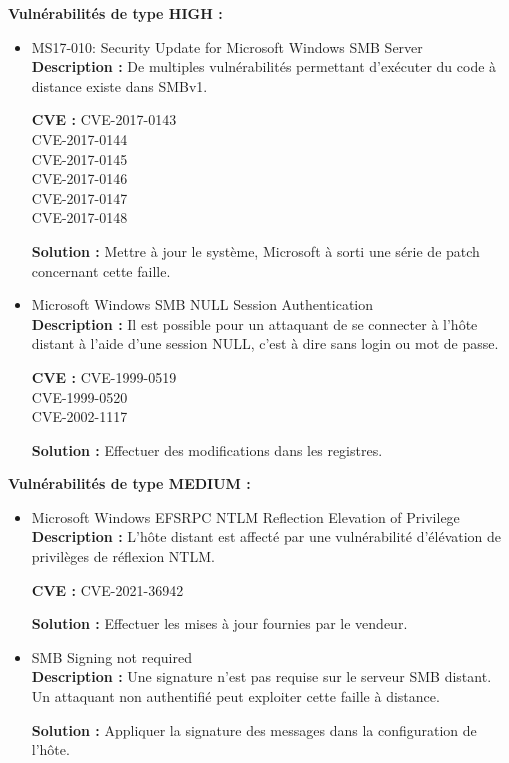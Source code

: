 \documentclass[french,paper=a4,oneside,captions=tableheading]{article}
\begin{document}
\textbf{Vulnérabilités de type HIGH :}\\
\begin{itemize}
\item MS17-010: Security Update for Microsoft Windows SMB Server \\
\textbf{Description :}
De multiples vulnérabilités permettant d'exécuter du code à distance existe dans SMBv1.

\textbf{CVE :}
CVE-2017-0143 \\
CVE-2017-0144\\
CVE-2017-0145\\
CVE-2017-0146\\
CVE-2017-0147\\
CVE-2017-0148


\textbf{Solution :}
Mettre à jour le système, Microsoft à sorti une série de patch concernant cette faille.\\

\item Microsoft Windows SMB NULL Session Authentication \\
\textbf{Description :}
Il est possible pour un attaquant de se connecter à l'hôte distant à l'aide d'une session NULL, c'est à dire sans login ou mot de passe.

\textbf{CVE :}
CVE-1999-0519\\
CVE-1999-0520\\
CVE-2002-1117


\textbf{Solution :}
Effectuer des modifications dans les registres.\\

\end{itemize}

\textbf{Vulnérabilités de type MEDIUM :}\\
\begin{itemize}
    \item Microsoft Windows EFSRPC NTLM Reflection Elevation of Privilege \\

\textbf{Description :}
L'hôte distant est affecté par une vulnérabilité d'élévation de privilèges de réflexion NTLM.

\textbf{CVE :}
CVE-2021-36942

\textbf{Solution :}
Effectuer les mises à jour fournies par le vendeur.

    \item SMB Signing not required \\
\textbf{Description :}
Une signature n'est pas requise sur le serveur SMB distant. Un attaquant non authentifié peut exploiter cette faille à distance.

\textbf{Solution :}
Appliquer la signature des messages dans la configuration de l'hôte.\\

\end{itemize}
\end{document}
